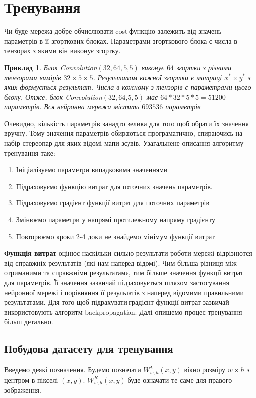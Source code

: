 \documentclass{article}
\newtheorem*{example*}{Приклад}
\theoremstyle{definition}
\begin{document}
\section{Тренування}
Чи буде мережа добре обчислювати cost-функцію залежить від значень параметрів в її згорткових блоках. Параметрами згорткового блока є числа в тензорах з якими він виконує згортку.
\begin{example*}
	Блок \textit{Convolution}$(32, 64, 5, 5)$ виконує $64$ згортки з різними тензорами вимірів $32 \times 5 \times 5$. Результатом кожної згортки є матриці $x^* \times y^*$ з яких формується результат. Числа в кожному з тензорів є параметрами цього блоку. Отже, блок \textit{Convolution}$(32, 64, 5, 5)$ має $64 * 32 * 5 * 5 = 51200$ параметрів. Вся нейронна мережа містить $693536$ параметрів
\end{example*} 

Очевидно, кількість параметрів занадто велика для того щоб обрати їх значення вручну. 
Тому значення параметрів обираються програматично, спираючись на набір стереопар для яких відомі мапи зсувів. Узагальнене описання алгоритму тренування таке:
\begin{enumerate}
	\item Ініціалізуемо параметри випадковими значеннями
	\item Підраховуємо функцію витрат для поточних значень параметрів. 
	\item Підраховуємо градієнт функції витрат для поточних параметрів
	\item Змінюємо параметри у напрямі протилежному напряму градієнту
	\item Повторюємо кроки 2-4 доки не знайдемо мінімум функції витрат
\end{enumerate}

\textbf{Функція витрат} оцінює наскільки сильно результати роботи мережі відрізнются від справжніх результатів (які нам наперед відомі). Чим більша різниця між отриманими та справжніми результатами, тим більше значення функції витрат для параметрів. Її значення зазвичай підраховується шляхом застосування нейронної мережі і порівняння її результатів з наперед відомими правильними результатами. Для того щоб підрахувати градієнт функції витрат зазвичай використовують алгоритм backpropagation. Далі опишемо процес тренування більш детально.

\subsection{Побудова датасету для тренування}
Введемо деякі позначення. Будемо позначати $W^L_{w,h}(x,y)$ вікно розміру $w \times h$ з центром в пікселі $(x,y)$. $W^R_{w,h}(x,y)$ буде означати те саме для правого зображення.
\end{document}
